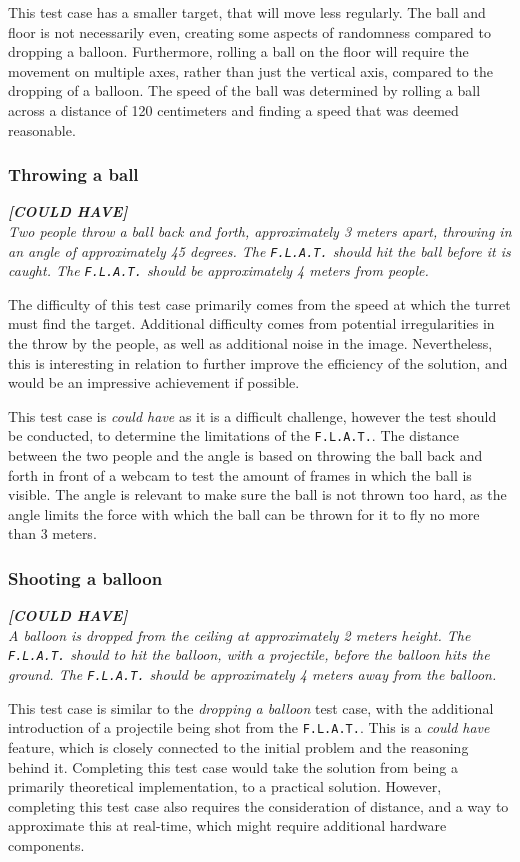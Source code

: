 This test case has a smaller target, that will move less regularly.
The ball and floor is not necessarily even, creating some aspects of randomness compared to dropping a balloon.
Furthermore, rolling a ball on the floor will require the movement on multiple axes, rather than just the vertical axis, compared to the dropping of a balloon.
The speed of the ball was determined by rolling a ball across a distance of 120 centimeters and finding a speed that was deemed reasonable.

\subsubsection{Throwing a ball}
\textit{\textbf{[COULD HAVE]}}\\
\textit{Two people throw a ball back and forth, approximately 3 meters apart, throwing in an angle of approximately 45 degrees.
The \texttt{F.L.A.T.} should hit the ball before it is caught.
The \texttt{F.L.A.T.} should be approximately 4 meters from people.}

The difficulty of this test case primarily comes from the speed at which the turret must find the target.
Additional difficulty comes from potential irregularities in the throw by the people, as well as additional noise in the image.
Nevertheless, this is interesting in relation to further improve the efficiency of the solution, and would be an impressive achievement if possible.

This test case is \textit{could have} as it is a difficult challenge, however the test should be conducted, to determine the limitations of the \texttt{F.L.A.T.}.
The distance between the two people and the angle is based on throwing the ball back and forth in front of a webcam to test the amount of frames in which the ball is visible.
The angle is relevant to make sure the ball is not thrown too hard, as the angle limits the force with which the ball can be thrown for it to fly no more than 3 meters.

\subsubsection{Shooting a balloon}
\textit{\textbf{[COULD HAVE]}}\\
\textit{A balloon is dropped from the ceiling at approximately 2 meters height.
The \texttt{F.L.A.T.} should to hit the balloon, with a projectile, before the balloon hits the ground.
The \texttt{F.L.A.T.} should be approximately 4 meters away from the balloon.}

This test case is similar to the \textit{dropping a balloon} test case, with the additional introduction of a projectile being shot from the \texttt{F.L.A.T.}.
This is a \textit{could have} feature, which is closely connected to the initial problem and the reasoning behind it.
Completing this test case would take the solution from being a primarily theoretical implementation, to a practical solution.
However, completing this test case also requires the consideration of distance, and a way to approximate this at real-time, which might require additional hardware components.
